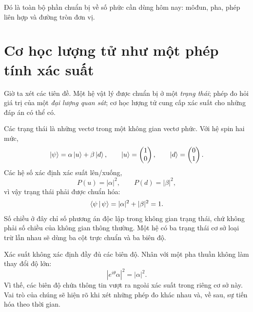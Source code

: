 \begin{classroomqa}
\end{classroomqa}

Đó là toàn bộ phần chuẩn bị về số phức cần dùng hôm nay: môđun, pha, phép liên hợp và đường tròn đơn vị.

\section{Cơ học lượng tử như một phép tính xác suất}

Giờ ta xét các tiên đề. Một hệ vật lý được chuẩn bị ở một \emph{trạng thái}; phép đo hỏi giá trị của một \emph{đại lượng quan sát}; cơ học lượng tử cung cấp xác suất cho những đáp án có thể có.

Các trạng thái là những vectơ trong một không gian vectơ phức. Với hệ spin hai mức,
\begin{equation}
  \left\lvert\psi\right\rangle=\alpha\left\lvert u\right\rangle+\beta\left\lvert d\right\rangle,
  \qquad
  \left\lvert u\right\rangle=\begin{pmatrix}1\\0\end{pmatrix},
  \qquad
  \left\lvert d\right\rangle=\begin{pmatrix}0\\1\end{pmatrix}.
  \label{eq:l03-two-level-state}
\end{equation}
Các hệ số xác định xác suất lên/xuống,
\begin{equation}
  P(u)=|\alpha|^2,
  \qquad
  P(d)=|\beta|^2,
\end{equation}
vì vậy trạng thái phải được chuẩn hóa:
\begin{equation}
  \left\langle\psi\,\middle|\,\psi\right\rangle
  =|\alpha|^2+|\beta|^2
  =1.
  \label{eq:l03-state-normalization}
\end{equation}
Số chiều ở đây chỉ số phương án độc lập trong không gian trạng thái, chứ không phải số chiều của không gian thông thường. Một hệ có ba trạng thái cơ sở loại trừ lẫn nhau sẽ dùng ba cột trực chuẩn và ba biên độ.

Xác suất không xác định đầy đủ các biên độ. Nhân với một pha thuần không làm thay đổi độ lớn:
\begin{equation}
  |e^{i\theta}\alpha|^2=|\alpha|^2.
\end{equation}
Vì thế, các biên độ chứa thông tin vượt ra ngoài xác suất trong riêng cơ sở này. Vai trò của chúng sẽ hiện rõ khi xét những phép đo khác nhau và, về sau, sự tiến hóa theo thời gian.

